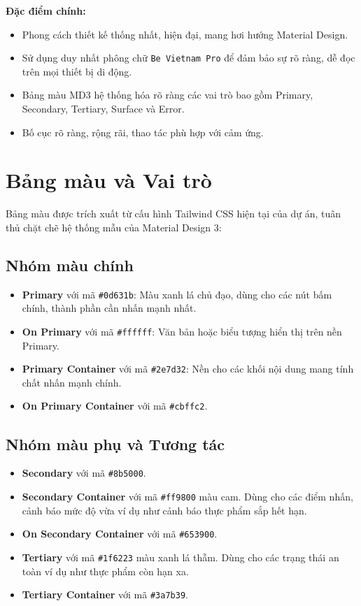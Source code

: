 \documentclass[12pt,a4paper]{article}
\newcommand{\code}[1]{\texttt{#1}}
\begin{document}
\textbf{Đặc điểm chính:}
\begin{itemize}[leftmargin=*]
  \item Phong cách thiết kế thống nhất, hiện đại, mang hơi hướng Material Design.
  \item Sử dụng duy nhất phông chữ \code{Be Vietnam Pro} để đảm bảo sự rõ ràng, dễ đọc trên mọi thiết bị di động.
  \item Bảng màu MD3 hệ thống hóa rõ ràng các vai trò bao gồm Primary, Secondary, Tertiary, Surface và Error.
  \item Bố cục rõ ràng, rộng rãi, thao tác phù hợp với cảm ứng.
\end{itemize}

\section{Bảng màu và Vai trò}
Bảng màu được trích xuất từ cấu hình Tailwind CSS hiện tại của dự án, tuân thủ chặt chẽ hệ thống mẫu của Material Design 3:

\subsection{Nhóm màu chính}
\begin{itemize}[leftmargin=*]
  \item \textbf{Primary} với mã \code{\#0d631b}: Màu xanh lá chủ đạo, dùng cho các nút bấm chính, thành phần cần nhấn mạnh nhất.
  \item \textbf{On Primary} với mã \code{\#ffffff}: Văn bản hoặc biểu tượng hiển thị trên nền Primary.
  \item \textbf{Primary Container} với mã \code{\#2e7d32}: Nền cho các khối nội dung mang tính chất nhấn mạnh chính.
  \item \textbf{On Primary Container} với mã \code{\#cbffc2}.
\end{itemize}

\subsection{Nhóm màu phụ và Tương tác}
\begin{itemize}[leftmargin=*]
  \item \textbf{Secondary} với mã \code{\#8b5000}.
  \item \textbf{Secondary Container} với mã \code{\#ff9800} màu cam. Dùng cho các điểm nhấn, cảnh báo mức độ vừa ví dụ như cảnh báo thực phẩm sắp hết hạn.
  \item \textbf{On Secondary Container} với mã \code{\#653900}.
  \item \textbf{Tertiary} với mã \code{\#1f6223} màu xanh lá thẫm. Dùng cho các trạng thái an toàn ví dụ như thực phẩm còn hạn xa.
  \item \textbf{Tertiary Container} với mã \code{\#3a7b39}.
\end{itemize}
\end{document}
